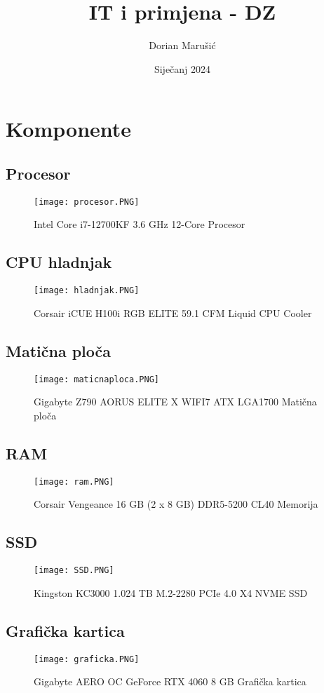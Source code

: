 \documentclass{report}
\title{IT i primjena - DZ}
\author{Dorian Marušić}
\date{Siječanj 2024}
\begin{document}
\maketitle
\tableofcontents
\listoffigures

\section{Komponente}
\subsection{Procesor}
\begin{figure}[h]
    \texttt{[image: procesor.PNG]}
    \caption{Intel Core i7-12700KF 3.6 GHz 12-Core Procesor}
\end{figure}
\subsection{CPU hladnjak}
\begin{figure}[h]
    \texttt{[image: hladnjak.PNG]}
    \caption{Corsair iCUE H100i RGB ELITE 59.1 CFM Liquid CPU Cooler}
\end{figure}
\subsection{Matična ploča}
\begin{figure}[h]
    \texttt{[image: maticnaploca.PNG]}
    \caption{Gigabyte Z790 AORUS ELITE X WIFI7 ATX LGA1700 Matična ploča}
\end{figure}
\subsection{RAM}
\begin{figure}[h]
    \texttt{[image: ram.PNG]}
    \caption{Corsair Vengeance 16 GB (2 x 8 GB) DDR5-5200 CL40 Memorija}
\end{figure}
\subsection{SSD}
\begin{figure}[h]
    \texttt{[image: SSD.PNG]}
    \caption{Kingston KC3000 1.024 TB M.2-2280 PCIe 4.0 X4 NVME SSD}
\end{figure}
\subsection{Grafička kartica}
\begin{figure}[h]
    \texttt{[image: graficka.PNG]}
    \caption{Gigabyte AERO OC GeForce RTX 4060 8 GB Grafička kartica}
\end{figure}
\end{document}

